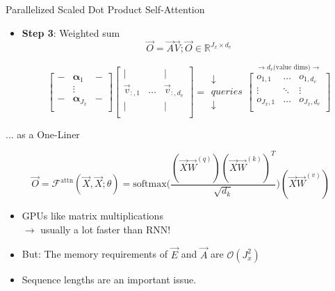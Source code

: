 \begin{vbframe}{Parallelized Scaled Dot Product Self-Attention}

\vfill

\begin{itemize}
\item \textbf{Step 3}: Weighted sum
$$\vec {O} = \vec {A} \vec {V}; \vec O \in \mathbb{R}^{J_x \times d_v}$$

$$
\begin{bmatrix}
- & \boldsymbol \alpha_1  & -  \\
& \vdots & \\
-  & \boldsymbol \alpha_{J_x}  &  -  \\
\end{bmatrix}
\begin{bmatrix}
\lvert &  & \lvert  \\
\vec {v}_{:,1} & \ldots & \vec {v}_{:,d_v} \\
\lvert &  & \lvert  \\
\end{bmatrix}
=
\begin{matrix} \downarrow \\ queries \\ \downarrow \end{matrix}
	\overset{\rightarrow d_v \text{(value dims)} \rightarrow}{
\begin{bmatrix}
o_{1,1} & \ldots & o_{1,d_v} \\
\vdots & \ddots & \vdots \\
o_{J_x,1} & \ldots & o_{J_x,d_v} \\
\end{bmatrix}}
$$
\end{itemize}

\vfill

\end{vbframe}

\begin{vbframe}{... as a One-Liner}

\vfill

\large
$$ \vec O = \mathcal{F}^\mathrm{attn}(\vec X, \vec X; \theta) = \mathrm{softmax}\Big(\frac{(\vec X\vec W^{(q)} ) (\vec X\vec W^{(k)} )^T}{\sqrt{d_k}}\Big)(\vec X\vec W^{(v)} ) $$
\begin{itemize}
\item GPUs like matrix multiplications\\$\rightarrow$ usually a lot faster than RNN!
\item But: The memory requirements of $\vec E$ and $\vec A$ are $\mathcal{O}(J_x^2)$
\item Sequence lengths are an important issue.
\end{itemize}

\vfill

\end{vbframe}

